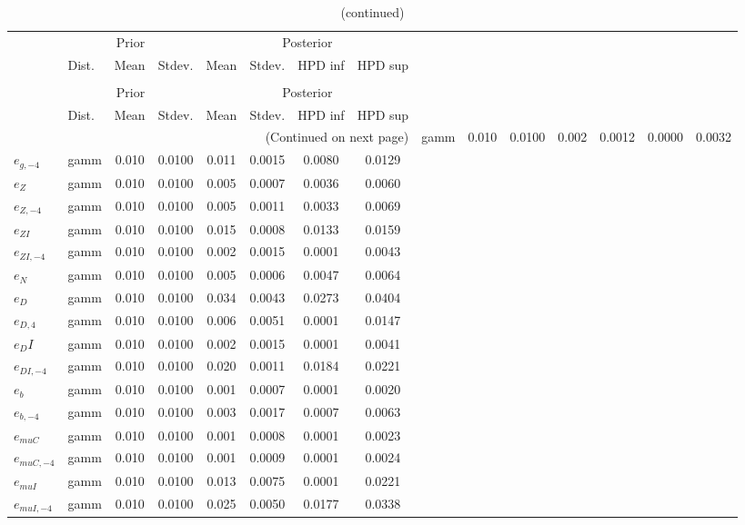  
\begin{center}
\begin{longtable}{llcccccc} 
\caption{Results from Metropolis-Hastings (standard deviation of structural shocks)}
 \label{Table:MHPosterior:2}\\
\toprule 
  & \multicolumn{3}{c}{Prior}  &  \multicolumn{4}{c}{Posterior} \\
  \cmidrule(r{.75em}){2-4} \cmidrule(r{.75em}){5-8}
  & Dist. & Mean  & Stdev. & Mean & Stdev. & HPD inf & HPD sup\\
\midrule \endfirsthead 
\caption{(continued)}\\\toprule 
  & \multicolumn{3}{c}{Prior}  &  \multicolumn{4}{c}{Posterior} \\
  \cmidrule(r{.75em}){2-4} \cmidrule(r{.75em}){5-8}
  & Dist. & Mean  & Stdev. & Mean & Stdev. & HPD inf & HPD sup\\
\midrule \endhead 
\bottomrule \multicolumn{8}{r}{(Continued on next page)} \endfoot 
\bottomrule \endlastfoot 
${e_g}$ & gamm &   0.010 & 0.0100 &   0.002& 0.0012 &  0.0000 &  0.0032 \\ 
${e_{g,-4}}$ & gamm &   0.010 & 0.0100 &   0.011& 0.0015 &  0.0080 &  0.0129 \\ 
${e_Z}$ & gamm &   0.010 & 0.0100 &   0.005& 0.0007 &  0.0036 &  0.0060 \\ 
${e_{Z,-4}}$ & gamm &   0.010 & 0.0100 &   0.005& 0.0011 &  0.0033 &  0.0069 \\ 
${e_{ZI}}$ & gamm &   0.010 & 0.0100 &   0.015& 0.0008 &  0.0133 &  0.0159 \\ 
${e_{ZI,-4}}$ & gamm &   0.010 & 0.0100 &   0.002& 0.0015 &  0.0001 &  0.0043 \\ 
${e_N}$ & gamm &   0.010 & 0.0100 &   0.005& 0.0006 &  0.0047 &  0.0064 \\ 
${e_D}$ & gamm &   0.010 & 0.0100 &   0.034& 0.0043 &  0.0273 &  0.0404 \\ 
${e_{D,4}}$ & gamm &   0.010 & 0.0100 &   0.006& 0.0051 &  0.0001 &  0.0147 \\ 
${e_DI}$ & gamm &   0.010 & 0.0100 &   0.002& 0.0015 &  0.0001 &  0.0041 \\ 
${e_{DI,-4}}$ & gamm &   0.010 & 0.0100 &   0.020& 0.0011 &  0.0184 &  0.0221 \\ 
${e_b}$ & gamm &   0.010 & 0.0100 &   0.001& 0.0007 &  0.0001 &  0.0020 \\ 
${e_{b,-4}}$ & gamm &   0.010 & 0.0100 &   0.003& 0.0017 &  0.0007 &  0.0063 \\ 
${e_{muC}}$ & gamm &   0.010 & 0.0100 &   0.001& 0.0008 &  0.0001 &  0.0023 \\ 
${e_{muC,-4}}$ & gamm &   0.010 & 0.0100 &   0.001& 0.0009 &  0.0001 &  0.0024 \\ 
${e_{muI}}$ & gamm &   0.010 & 0.0100 &   0.013& 0.0075 &  0.0001 &  0.0221 \\ 
${e_{muI,-4}}$ & gamm &   0.010 & 0.0100 &   0.025& 0.0050 &  0.0177 &  0.0338 \\ 
\end{longtable}
 \end{center}
